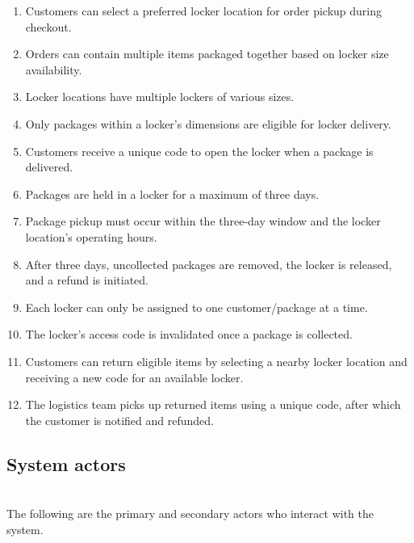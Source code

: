 \begin{enumerate}
\item
\protect{}\label{wHeW4hyv9DUPYiKW7Pv2G}
Customers can select a preferred locker location for order pickup during checkout.
\item
\protect{}\label{6ShAWi6PVxmzin1fiZ1tW}
Orders can contain multiple items packaged together based on locker size availability.
\item
\protect{}\label{stsiJaIKcA3DXgH0zfMlT}
Locker locations have multiple lockers of various sizes.
\item
\protect{}\label{NOQJBCy-UEFHYtMg3xFWw}
Only packages within a locker's dimensions are eligible for locker delivery.
\item
\protect{}\label{h1CFz9yVeEgHUb88u2d5X}
Customers receive a unique code to open the locker when a package is delivered.
\item
\protect{}\label{jJxQLUtbOXKED8ZhD2gVz}
Packages are held in a locker for a maximum of three days.
\item
\protect{}\label{d5FzKns1o2dpooHHG0Xbf}
Package pickup must occur within the three-day window and the locker location's operating hours.
\item
\protect{}\label{SFbsFlIPu1J8MZrlNIMIB}
After three days, uncollected packages are removed, the locker is released, and a refund is initiated.
\item
\protect{}\label{dvFlDSrFmCTXmO4ql9C6Q}
Each locker can only be assigned to one customer/package at a time.
\item
\protect{}\label{qlI58ATCQvsiLKg6yU-yp}
The locker's access code is invalidated once a package is collected.
\item
\protect{}\label{-rs--MK2tJz2BQpN5tzQR}
Customers can return eligible items by selecting a nearby locker location and receiving a new code for an available locker.
\item
\protect{}\label{K8uEoZ6K9YJTZrJU2ahnZ}
The logistics team picks up returned items using a unique code, after which the customer is notified and refunded.
\end{enumerate}

\subsection{System actors}\label{T4HM0is7bZjPBeXieQAjr}
\\
The following are the primary and secondary actors who interact with the system.

